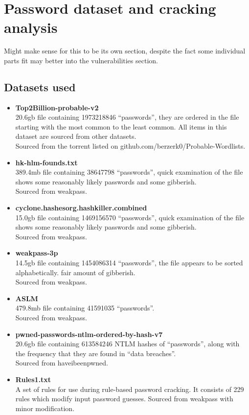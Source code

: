 \documentclass[11pt]{article}
\begin{document}
\section{Password dataset and cracking analysis}
Might make sense for this to be its own section, despite the fact some individual parts fit may better into the vulnerabilities section.
\subsection{Datasets used} \label{datasets}
\begin{itemize}
\item \textbf{Top2Billion-probable-v2}\\
20.6gb file containing 1973218846 ``passwords'', they are ordered in the file starting with the most common to the least common. All items in this dataset are sourced from other datasets.\\
Sourced from the torrent listed on github.com/berzerk0/Probable-Wordlists.
\item \textbf{hk-hlm-founds.txt}\\
389.4mb file containing 38647798 ``passwords'', quick examination of the file shows some reasonably likely passwords and some gibberish.\\
Sourced from weakpass.
\item \textbf{cyclone.hashesorg.hashkiller.combined}\\
15.0gb file containing 1469156570 ``passwords'', quick examination of the file shows some reasonably likely passwords and some gibberish.\\
Sourced from weakpass.
\item \textbf{weakpass-3p}\\
14.5gb file containing 1454086314 ``passwords'', the file appears to be sorted alphabetically. fair amount of gibberish.\\
Sourced from weakpass.
\item \textbf{ASLM}\\
479.8mb file containing 41591035 ``passwords''.\\
Sourced from weakpass.
\item \textbf{pwned-passwords-ntlm-ordered-by-hash-v7}\\
20.6gb file containing 613584246 NTLM hashes of ``passwords'', along with the frequency that they are found in ``data breaches''.\\
Sourced from haveibeenpwned.
\item \textbf{Rules1.txt}\\
A set of rules for use during rule-based password cracking. It consists of 229 rules which modify input password guesses.
Sourced from weakpass with minor modification.
\end{itemize}
\end{document}
